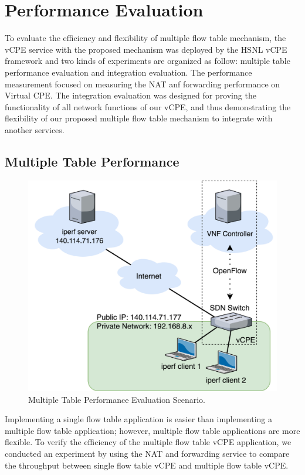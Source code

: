 \chapter{Performance Evaluation} \label{ch:evaluation}

To evaluate the efficiency and flexibility of multiple flow table mechanism, the vCPE service with the proposed mechanism was deployed by the HSNL vCPE framework and two kinds of experiments are organized as follow: multiple table performance evaluation and integration evaluation.
The performance measurement focused on measuring the NAT anf forwarding performance on Virtual CPE.
The integration evaluation was designed for proving the functionality of all network functions of our vCPE, and thus demonstrating the flexibility of our proposed multiple flow table mechanism to integrate with another services.

\section{Multiple Table Performance}

\begin{figure}[!t]
\centering
\includegraphics[width=\textwidth]{./fig/throughput_measurement_scenario.png}
\caption{Multiple Table Performance Evaluation Scenario.}
\label{fig:throughput_measurement_scenario}
\end{figure}

Implementing a single flow table application is easier than implementing a multiple flow table application; however, multiple flow table applications are more flexible.
To verify the efficiency of the multiple flow table vCPE application, we conducted an experiment by using the NAT and forwarding service to compare the throughput between single flow table vCPE and multiple flow table vCPE.

